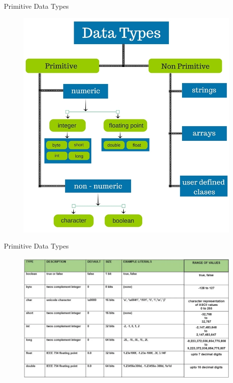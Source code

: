 \documentclass[11pt]{beamer}
\begin{document}
\begin{frame}[fragile]{Primitive Data Types}
    \noindent
    \begin{figure}[H]
    \centering
    \includegraphics[scale=0.35]{Images/chapter02_section_04_primitive.jpg}
    \end{figure}
\end{frame}

\begin{frame}[fragile]{Primitive Data Types}
    \noindent
    \begin{figure}[H]
    \centering
    \includegraphics[scale=0.35]{Images/chapter02_section04_primitive01.png}
    \end{figure}
\end{frame}
\end{document}
